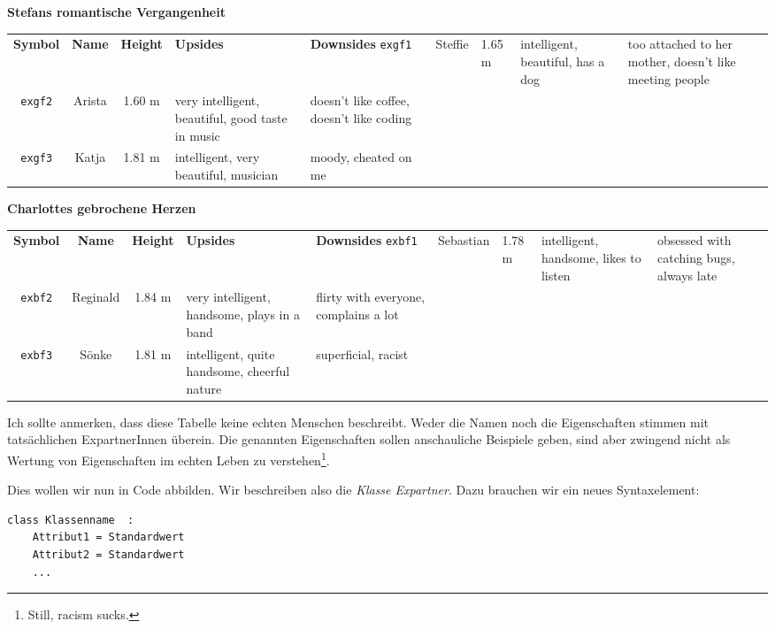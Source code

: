 \begin{tcolorbox}[title=Eine Liste von Liebschaften]
\begin{center}
\textbf{Stefans romantische Vergangenheit}
\begin{tabular}{c|ccp{.3\linewidth}p{.3\linewidth}}
	\textbf{Symbol} & \textbf{Name} & \textbf{Height} & \textbf{Upsides}                                 & \textbf{Downsides} \tabcrlf
	\texttt{exgf1}  & Steffie       & 1.65 m          & intelligent, beautiful, has a dog                & too attached to her mother, 
																																																				doesn't like meeting people \\
	\texttt{exgf2}  & Arista        & 1.60 m          & very intelligent, beautiful, good taste in music & doesn't like coffee, doesn't like coding \\
	\texttt{exgf3}  & Katja         & 1.81 m          & intelligent, very beautiful, musician            & moody, cheated on me
\end{tabular}
\end{center}

\begin{center}
\textbf{Charlottes gebrochene Herzen}
\begin{tabular}{c|ccp{.3\linewidth}p{.3\linewidth}}
	\textbf{Symbol} & \textbf{Name} & \textbf{Height} & \textbf{Upsides}                                 & \textbf{Downsides} \tabcrlf
	\texttt{exbf1}  & Sebastian     & 1.78 m          & intelligent, handsome, likes to listen           & obsessed with catching bugs, always late \\
	\texttt{exbf2}  & Reginald      & 1.84 m          & very intelligent, handsome, plays in a band      & flirty with everyone, complains a lot \\
	\texttt{exbf3}  & Sönke         & 1.81 m          & intelligent, quite handsome, cheerful nature     & superficial, racist
\end{tabular}
\end{center}
Ich sollte anmerken, dass diese Tabelle keine echten Menschen beschreibt. Weder die Namen noch die Eigenschaften stimmen mit tatsächlichen ExpartnerInnen überein. Die genannten Eigenschaften sollen anschauliche Beispiele geben, sind aber zwingend nicht als Wertung von Eigenschaften im echten Leben zu verstehen\footnote{Still, racism sucks.}.
\end{tcolorbox}

Dies wollen wir nun in Code abbilden. Wir beschreiben also die \emph{Klasse Expartner}. Dazu brauchen wir ein neues Syntaxelement:
\begin{codebox}
\begin{verbatim}
class Klassenname  :
    Attribut1 = Standardwert
    Attribut2 = Standardwert
    ...
\end{verbatim}
\end{codebox}

